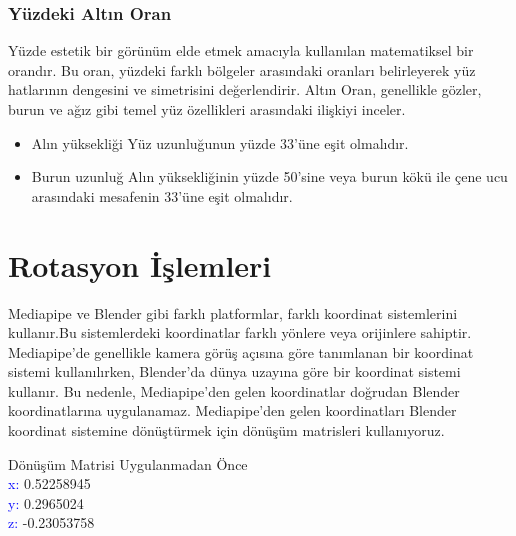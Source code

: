 \documentclass[12pt, a4paper]{article}
\begin{document}
\subsubsection{Yüzdeki Altın Oran}
Yüzde estetik bir görünüm elde etmek amacıyla kullanılan  matematiksel bir orandır. Bu oran, yüzdeki farklı bölgeler arasındaki oranları belirleyerek yüz hatlarının dengesini ve simetrisini değerlendirir. Altın Oran, genellikle gözler, burun ve ağız gibi temel yüz özellikleri arasındaki ilişkiyi inceler.
\begin{itemize}
	\item Alın yüksekliği Yüz uzunluğunun  yüzde 33'üne eşit olmalıdır.
	\item Burun uzunluğ  Alın yüksekliğinin yüzde 50'sine veya burun kökü ile çene ucu arasındaki mesafenin 33'üne eşit olmalıdır.
\end{itemize}

\section{Rotasyon İşlemleri}
Mediapipe ve Blender gibi farklı platformlar, farklı koordinat sistemlerini kullanır.Bu sistemlerdeki koordinatlar farklı yönlere veya orijinlere sahiptir. Mediapipe'de genellikle kamera görüş açısına göre tanımlanan bir koordinat sistemi kullanılırken, Blender'da dünya uzayına göre bir koordinat sistemi kullanır. Bu nedenle, Mediapipe'den gelen koordinatlar doğrudan Blender koordinatlarına uygulanamaz. 
Mediapipe'den gelen koordinatları Blender koordinat sistemine dönüştürmek için dönüşüm matrisleri kullanıyoruz.
\begin{center}
	Dönüşüm Matrisi Uygulanmadan Önce \\
	\textcolor{blue}{x:} 0.52258945 \\
	\textcolor{blue}{y:} 0.2965024 \\
	\textcolor{blue}{z:} -0.23053758 \\
\end{center}

\vspace{0.1cm}
\end{document}
